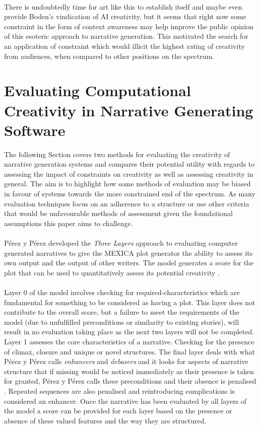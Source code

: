 \documentclass[letterpaper]{article}
\begin{document}
\\There is undoubtedly time for art like this to establish itself and maybe even provide Boden's vindication of AI creativity, but it seems that right now some constraint in the form of context awareness may help improve the public opinion of this esoteric approach to narrative generation. This motivated the search for an application of constraint which would illicit the highest rating of creativity from audiences, when compared to other positions on the spectrum.
\section{Evaluating Computational Creativity in Narrative Generating Software} \label{sec:eval}
The following Section covers two methods for evaluating the creativity of narrative generation systems and compares their potential utility with regards to assessing the impact of constraints on creativity as well as assessing creativity in general. The aim is to highlight how  some methods of evaluation may be biased in favour of systems towards the more constrained end of the spectrum. As many evaluation techniques focus on an adherence to a structure or use other criteria that would be unfavourable methods of assessment given the foundational assumptions this paper aims to challenge. 
\\
\\P\'erez y P\'erez developed the \emph{Three Layers} approach to evaluating computer generated narratives to give the MEXICA plot generator the ability to assess its own output and the output of other writers. The model generates a score for the plot that can be used to quantitatively assess its potential creativity \cite{y2014three}.\\
\\Layer 0 of the model involves checking for required-characteristics  which are fundamental for something to be considered as having a plot. This layer does not contribute to the overall score, but a failure to meet the requirements of the model (due to unfulfilled preconditions or similarity to existing stories), will result in no evaluation taking place as the next two layers will not be completed. Layer 1 assesses the core characteristics of a narrative. Checking for the presence of climax, closure and unique or novel structures. The final layer deals with what P\'erez y P\'erez calls \emph{enhancers} and \emph{debasers} and it looks for aspects of narrative structure that if missing would be noticed immediately as their presence is taken for granted, P\'erez y P\'erez calls these preconditions and their absence is  penalised \cite{y2014three}. Repeated sequences are also penalised and reintroducing complications is considered an enhancer. Once the narrative has been evaluated by all layers of the model a score can be provided for each layer based on the presence or absence of these valued features and the way they are structured.\\
\end{document}
